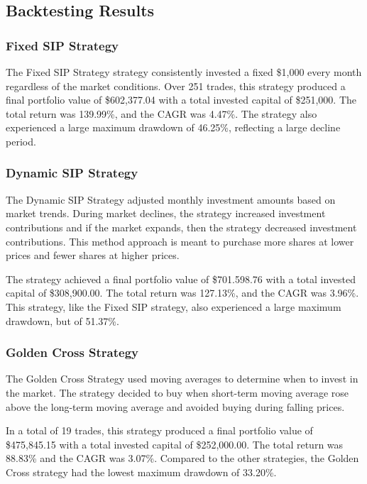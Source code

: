 \documentclass[12pt]{article}
\begin{document}
\subsection{Backtesting Results}
\subsubsection{Fixed SIP Strategy}

The Fixed SIP Strategy strategy consistently invested a fixed \$1,000 every month regardless 
of the market conditions. Over 251 trades, this strategy produced a final portfolio value 
of \$602,377.04 with a total invested capital of \$251,000. The total return was 139.99\%, 
and the CAGR was 4.47\%. The strategy also experienced a large maximum drawdown of 46.25\%, 
reflecting a large decline period. 

\subsubsection{Dynamic SIP Strategy}

The Dynamic SIP Strategy adjusted monthly investment amounts based on market trends. During market declines, the strategy increased investment contributions and if the market expands, then the strategy decreased investment contributions. This method approach is meant to purchase more shares at lower prices and fewer shares at higher prices. 

The strategy achieved a final portfolio value of \$701.598.76 with a total invested capital 
of \$308,900.00. The total return was 127.13\%, and the CAGR was 3.96\%. 
This strategy, like the Fixed SIP strategy, also experienced a large maximum drawdown, 
but of 51.37\%. 

\subsubsection{Golden Cross Strategy}

The Golden Cross Strategy used moving averages to determine when to invest in the market. 
The strategy decided to buy when short-term moving average rose above the long-term moving 
average and avoided buying during falling prices. 

In a total of 19 trades, this strategy produced a final portfolio value of \$475,845.15 with a 
total invested capital of \$252,000.00. The total return was 88.83\% and the CAGR was 3.07\%. 
Compared to the other strategies, the Golden Cross strategy had the lowest maximum drawdown 
of 33.20\%. 
\end{document}
